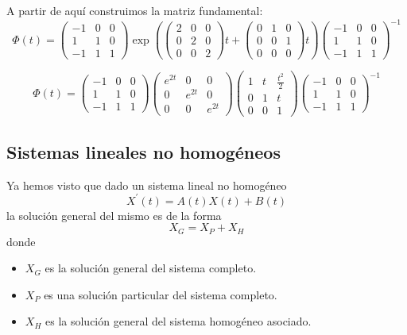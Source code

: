 \begin{example}
A partir de aquí construimos la matriz fundamental:
$$\Phi(t) = \begin{pmatrix}
-1 & 0 & 0\\ 1 & 1 & 0\\-1& 1& 1
\end{pmatrix}\exp\left(\begin{pmatrix}
2 & 0 & 0\\ 0 & 2 & 0\\0& 0& 2
\end{pmatrix}t+\begin{pmatrix}
0 & 1 & 0\\ 0 & 0 & 1\\0& 0& 0
\end{pmatrix}t\right)\begin{pmatrix}
-1 & 0 & 0\\ 1 & 1 & 0\\-1& 1& 1
\end{pmatrix}^{-1}$$

$$\Phi(t) = \begin{pmatrix}
-1 & 0 & 0\\ 1 & 1 & 0\\-1& 1& 1
\end{pmatrix}\begin{pmatrix}
e^{2t} & 0 & 0\\ 0 & e^{2t} & 0\\0& 0& e^{2t}
\end{pmatrix}\begin{pmatrix}
1 & t & \frac{t^2}{2}\\ 0 & 1 & t\\ 0 & 0 & 1
\end{pmatrix}\begin{pmatrix}
-1 & 0 & 0\\ 1 & 1 & 0\\-1& 1& 1
\end{pmatrix}^{-1}$$

\end{example}

\subsection{Sistemas lineales no homogéneos}
Ya hemos visto que dado un sistema lineal no homogéneo $$X^\prime(t) = A(t)X(t)+B(t)$$ la solución general del mismo es de la forma $$X_G = X_P + X_H$$ donde \begin{itemize}
\item $X_G$ es la solución general del sistema completo.

\item $X_P$ es una solución particular del sistema completo.

\item $X_H$ es la solución general del sistema homogéneo asociado.
\end{itemize}

